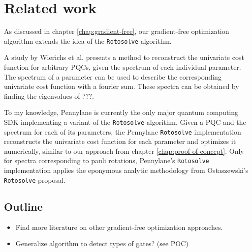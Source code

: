 \chapter{Related work}
\label{chap:related-work}

As discussed in chapter \ref{chap:gradient-free}, our gradient-free optimization
algorithm extends the idea of the \texttt{Rotosolve}
\cite{ostaszewski_structure_2021} algorithm.

A study by Wierichs et al. \cite{wierichs_general_2022} presents a method to
reconstruct the univariate cost function for arbitrary PQCs, given the spectrum
of each individual parameter.
The spectrum of a parameter can be used to describe the corresponding univariate
cost function with a fourier sum.
These spectra can be obtained by finding the eigenvalues of ???.

To my knowledge, Pennylane \cite{bergholm_pennylane_2022} is currently the only
major quantum computing SDK implementing a variant of the \texttt{Rotosolve}
\cite{ostaszewski_structure_2021} algorithm.
Given a PQC and the spectrum for each of its parameters, the Pennylane
\texttt{Rotosolve} implementation reconstructs the univariate cost function for
each parameter and optimizes it numerically, similar to our approach from
chapter \ref{chap:proof-of-concept}.
Only for spectra corresponding to pauli rotations, Pennylane's
\texttt{Rotosolve} implementation applies the eponymous analytic methodology
from Ostaszewski's \texttt{Rotosolve} proposal.

\section{Outline}
\begin{itemize}
    \item
        Find more literature on other gradient-free optimization
        approaches.
    \item Generalize algorithm to detect types of gates? (see POC)
\end{itemize}